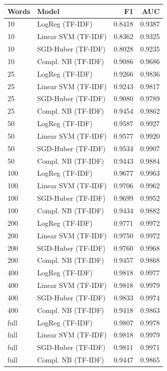 \begin{tabular}{llrr}
\toprule
Words & Model & F1 & AUC \\
\midrule
10 & LogReg (TF-IDF) & 0.8418 & 0.9387 \\
10 & Linear SVM (TF-IDF) & 0.8362 & 0.9325 \\
10 & SGD-Huber (TF-IDF) & 0.8028 & 0.9235 \\
10 & Compl. NB (TF-IDF) & 0.9086 & 0.9686 \\
25 & LogReg (TF-IDF) & 0.9266 & 0.9836 \\
25 & Linear SVM (TF-IDF) & 0.9243 & 0.9817 \\
25 & SGD-Huber (TF-IDF) & 0.9080 & 0.9789 \\
25 & Compl. NB (TF-IDF) & 0.9454 & 0.9862 \\
50 & LogReg (TF-IDF) & 0.9587 & 0.9927 \\
50 & Linear SVM (TF-IDF) & 0.9577 & 0.9920 \\
50 & SGD-Huber (TF-IDF) & 0.9534 & 0.9907 \\
50 & Compl. NB (TF-IDF) & 0.9443 & 0.9884 \\
100 & LogReg (TF-IDF) & 0.9677 & 0.9963 \\
100 & Linear SVM (TF-IDF) & 0.9706 & 0.9962 \\
100 & SGD-Huber (TF-IDF) & 0.9699 & 0.9952 \\
100 & Compl. NB (TF-IDF) & 0.9434 & 0.9882 \\
200 & LogReg (TF-IDF) & 0.9771 & 0.9972 \\
200 & Linear SVM (TF-IDF) & 0.9750 & 0.9972 \\
200 & SGD-Huber (TF-IDF) & 0.9760 & 0.9968 \\
200 & Compl. NB (TF-IDF) & 0.9457 & 0.9868 \\
400 & LogReg (TF-IDF) & 0.9818 & 0.9977 \\
400 & Linear SVM (TF-IDF) & 0.9818 & 0.9979 \\
400 & SGD-Huber (TF-IDF) & 0.9833 & 0.9974 \\
400 & Compl. NB (TF-IDF) & 0.9418 & 0.9863 \\
full & LogReg (TF-IDF) & 0.9807 & 0.9978 \\
full & Linear SVM (TF-IDF) & 0.9818 & 0.9979 \\
full & SGD-Huber (TF-IDF) & 0.9811 & 0.9971 \\
full & Compl. NB (TF-IDF) & 0.9447 & 0.9865 \\
\bottomrule
\end{tabular}
